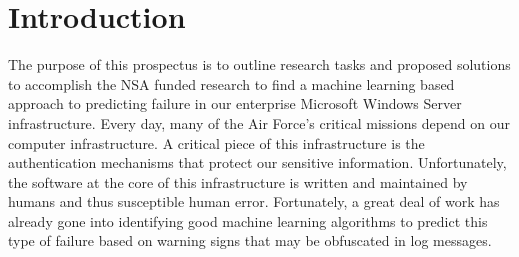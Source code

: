 \documentclass[12pt,letterpaper,oneside]{article}
\begin{document}
\section{Introduction}
The purpose of this prospectus is to outline research tasks and proposed
solutions to accomplish the NSA funded research to find a machine learning
based approach to predicting failure in our enterprise Microsoft Windows Server
infrastructure.  Every day, many of the Air Force's critical missions depend on
our computer infrastructure.  A critical piece of this infrastructure is the
authentication mechanisms that protect our sensitive information.
Unfortunately, the software at the core of this infrastructure is written and
maintained by humans and thus susceptible human error.  Fortunately, a great
deal of work has already gone into identifying good machine learning algorithms
to predict this type of failure based on warning signs that may be obfuscated
in log messages.


 
	
\end{document}
